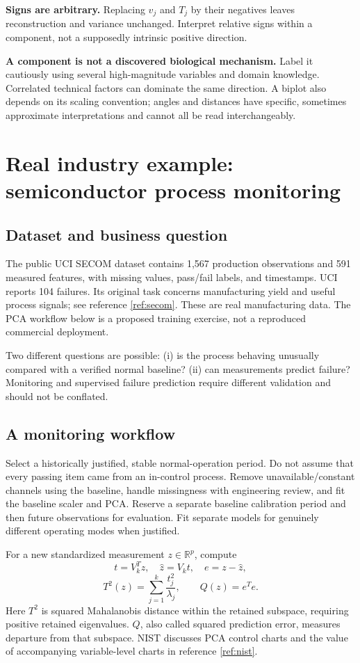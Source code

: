 \documentclass[11pt]{article}
\newcommand{\R}{\mathbb R}\newcommand{\tr}{\operatorname{tr}}\newcommand{\Cov}{\operatorname{Cov}}
\begin{document}
\textbf{Signs are arbitrary.} Replacing $v_j$ and $T_j$ by their negatives leaves reconstruction and variance unchanged. Interpret relative signs within a component, not a supposedly intrinsic positive direction.

\textbf{A component is not a discovered biological mechanism.} Label it cautiously using several high-magnitude variables and domain knowledge. Correlated technical factors can dominate the same direction. A biplot also depends on its scaling convention; angles and distances have specific, sometimes approximate interpretations and cannot all be read interchangeably.

\section{Real industry example: semiconductor process monitoring}
\subsection{Dataset and business question}
The public UCI SECOM dataset contains 1,567 production observations and 591 measured features, with missing values, pass/fail labels, and timestamps. UCI reports 104 failures. Its original task concerns manufacturing yield and useful process signals; see reference \ref{ref:secom}. These are real manufacturing data. The PCA workflow below is a proposed training exercise, not a reproduced commercial deployment.

Two different questions are possible: (i) is the process behaving unusually compared with a verified normal baseline? (ii) can measurements predict failure? Monitoring and supervised failure prediction require different validation and should not be conflated.

\subsection{A monitoring workflow}
Select a historically justified, stable normal-operation period. Do not assume that every passing item came from an in-control process. Remove unavailable/constant channels using the baseline, handle missingness with engineering review, and fit the baseline scaler and PCA. Reserve a separate baseline calibration period and then future observations for evaluation. Fit separate models for genuinely different operating modes when justified.

For a new standardized measurement $z\in\R^p$, compute
\[
t=V_k^Tz,\quad \hat z=V_kt,\quad e=z-\hat z,
\]
\[
T^2(z)=\sum_{j=1}^{k}\frac{t_j^2}{\lambda_j},\qquad Q(z)=e^Te.
\]
Here $T^2$ is squared Mahalanobis distance within the retained subspace, requiring positive retained eigenvalues. $Q$, also called squared prediction error, measures departure from that subspace. NIST discusses PCA control charts and the value of accompanying variable-level charts in reference \ref{ref:nist}.
\end{document}
